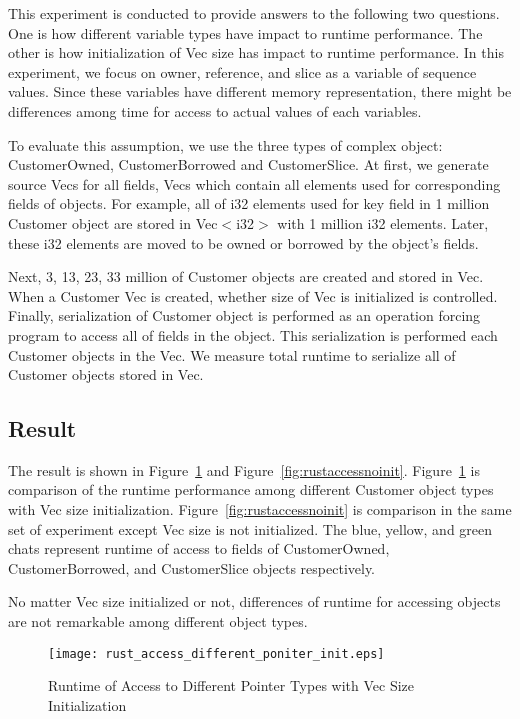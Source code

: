 This experiment is conducted to provide answers to the following two questions. One is how different variable types have impact to runtime performance.
The other is how initialization of Vec size has impact to runtime performance. 
In this experiment, we focus on owner, reference, and slice as a variable of sequence values. 
Since these variables have different memory representation, there might be differences among time for access to actual values of each variables.

To evaluate this assumption, we use the three types of complex object: CustomerOwned, CustomerBorrowed and CustomerSlice. 
At first, we generate source Vecs for all fields, Vecs which contain all elements used for corresponding fields of objects.
For example, all of i32 elements used for key field in 1 million Customer object are stored in Vec$<$i32$>$ with 1 million i32 elements. 
Later, these i32 elements are moved to be owned or borrowed by the object's fields.

Next, 3, 13, 23, 33 million of Customer objects are created and stored in Vec. 
When a Customer Vec is created, whether size of Vec is initialized is controlled. 
Finally, serialization of Customer object is performed as an operation forcing program to access all of fields in the object.
This serialization is performed each Customer objects in the Vec. We measure total runtime to serialize all of Customer objects 
stored in Vec. 

\subsection{Result}
\label{sec:history}
The result is shown in Figure~\ref{fig:rustaccessinit} and Figure~\ref{fig:rustaccessnoinit}.
Figure~\ref{fig:rustaccessinit} is comparison of the runtime performance among different Customer object types with Vec size initialization.
Figure~\ref{fig:rustaccessnoinit} is comparison in the same set of experiment except Vec size is not initialized. 
The blue, yellow, and green chats represent runtime of access to fields of CustomerOwned, CustomerBorrowed, and CustomerSlice objects respectively.

No matter Vec size initialized or not, differences of runtime for accessing objects are not remarkable among different object types. 


\begin{figure}[htb]
    \texttt{[image: rust\_access\_different\_poniter\_init.eps]}
    \caption{Runtime of Access to Different Pointer Types with Vec Size Initialization}
    \label{fig:rustaccessinit}
\end{figure}

